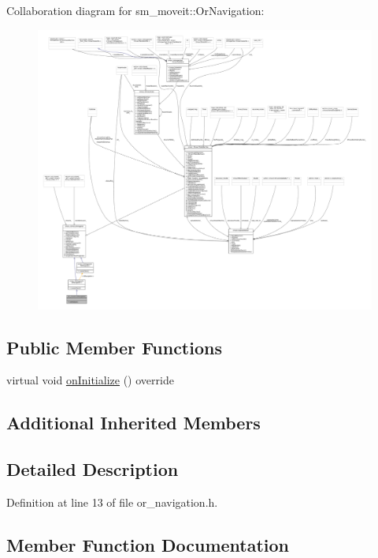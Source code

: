 Collaboration diagram for sm\+\_\+moveit\+:\+:Or\+Navigation\+:
\nopagebreak
\begin{figure}[H]
\begin{center}
\leavevmode
\includegraphics[width=350pt]{classsm__moveit_1_1OrNavigation__coll__graph}
\end{center}
\end{figure}
\subsection*{Public Member Functions}
\begin{DoxyCompactItemize}
\item 
virtual void \hyperlink{classsm__moveit_1_1OrNavigation_a242ad8c4d031d2fae3343e8a46bfec57}{on\+Initialize} () override
\end{DoxyCompactItemize}
\subsection*{Additional Inherited Members}


\subsection{Detailed Description}


Definition at line 13 of file or\+\_\+navigation.\+h.



\subsection{Member Function Documentation}
